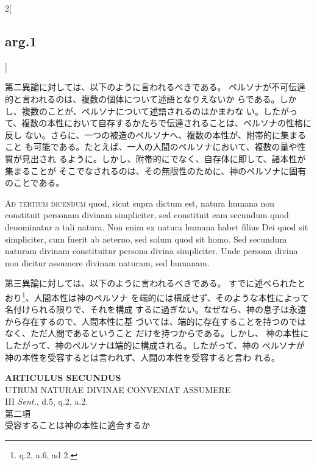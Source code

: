 \documentclass[paper=a4paper,fontsize=10pt,jafontsize=9pt,titlepage]{jlreq}
\begin{document}
\begin{paracol}{2}[\subsection{arg.1}]
\switchcolumn

第二異論に対しては、以下のように言われるべきである。
ペルソナが不可伝達的と言われるのは、複数の個体について述語となりえないか
 らである。しかし、複数のことが、ペルソナについて述語されるのはかまわな
 い。したがって、複数の本性において自存するかたちで伝達されることは、ペルソナの性格に反し
 ない。さらに、一つの被造のペルソナへ、複数の本性が、附帯的に集まること
 も可能である。たとえば、一人の人間のペルソナにおいて、複数の量や性質が見出され
 るように。しかし、附帯的にでなく、自存体に即して、諸本性が集まることが
 そこでなされるのは、その無限性のために、神のペルソナに固有のことである。

\switchcolumn*[\subsection{ad.3}]

{\scshape Ad tertium dicendum} quod, sicut supra dictum est, natura humana non
constituit personam divinam simpliciter, sed constituit eam secundum
quod denominatur a tali natura. Non enim ex natura humana habet filius
Dei quod sit simpliciter, cum fuerit ab aeterno, sed solum quod sit
homo. Sed secundum naturam divinam constituitur persona divina
simpliciter. Unde persona divina non dicitur assumere divinam naturam,
sed humanam.

\switchcolumn

第三異論に対しては、以下のように言われるべきである。
すでに述べられたとおり\footnote{q.2, a.6, ad 2.}、人間本性は神のペルソナ
 を端的には構成せず、そのような本性によって名付けられる限りで、それを構成
 するに過ぎない。なぜなら、神の息子は永遠から存在するので、人間本性に基
 づいては、端的に存在することを持つのではなく、ただ人間であるということ
 だけを持つからである。しかし、
 神の本性にしたがって、神のペルソナは端的に構成される。したがって、神の
 ペルソナが神の本性を受容するとは言われず、人間の本性を受容すると言わ
 れる。

\end{paracol}
\newpage
{}
{}
\setcounter{section}{2}
\setcounter{subsection}{0}







\begin{center}
 {\Large {\bfseries ARTICULUS SECUNDUS}}\\
 {\large UTRUM NATURAE DIVINAE CONVENIAT ASSUMERE}\\
 {\footnotesize III {\itshape Sent.}, d.5, q.2, a.2.}\\
 {\Large 第二項\\受容することは神の本性に適合するか}
\end{center}
\end{document}
